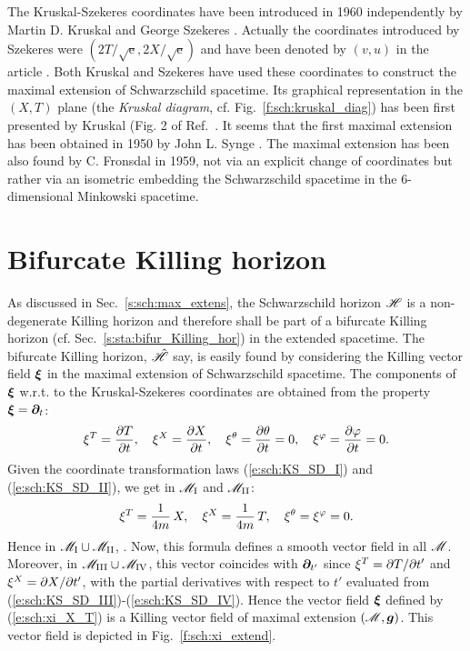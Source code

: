 \begin{hist}
\label{n:max:KS_coord}
The Kruskal-Szekeres coordinates have been introduced in 1960 independently
by Martin D. Kruskal \cite{Krusk60} and George Szekeres \cite{Szeke60}.
Actually the coordinates
introduced by Szekeres were $(2T/\sqrt{\mathrm{e}}, 2X/\sqrt{\mathrm{e}})$
and have been denoted by $(v,u)$ in the article \cite{Szeke60}. Both Kruskal and Szekeres
have used these coordinates to construct the maximal extension of Schwarzschild
spacetime. Its graphical representation in the $(X,T)$ plane (the
\emph{Kruskal diagram}, cf. Fig.~\ref{f:sch:kruskal_diag}) has been first presented by
Kruskal (Fig. 2 of Ref.~\cite{Krusk60}.
It seems that the first maximal extension has been obtained in 1950
by John L. Synge \cite{Synge50}.
The maximal extension has been also found by C. Fronsdal \cite{Frons59} in 1959, not via an explicit change of coordinates but rather via
an isometric embedding the Schwarzschild spacetime in the 6-dimensional Minkowski spacetime.
\end{hist}


\section{Bifurcate Killing horizon}

As discussed in Sec.~\ref{s:sch:max_extens}, the Schwarzschild horizon
$\mathscr{H}$ is
a non-degenerate Killing horizon and therefore shall be part of
a bifurcate Killing horizon (cf. Sec.~\ref{s:sta:bifur_Killing_hor})
in the extended spacetime.
The bifurcate Killing horizon, $\hat{\mathscr{H}}$ say, is easily found by
considering the Killing vector field $\bm{\xi}$ in the maximal extension
of Schwarzschild spacetime. The components of $\bm{\xi}$ w.r.t. to the
Kruskal-Szekeres coordinates are obtained from the
property $\bm{\xi} = \bm{\partial}_t$:
\[
    \xi^T = \frac{\partial T}{\partial t}, \quad
    \xi^X = \frac{\partial X}{\partial t}, \quad
    \xi^\theta = \frac{\partial \theta}{\partial t} = 0, \quad
    \xi^\varphi = \frac{\partial \varphi}{\partial t} = 0 .
\]
Given the coordinate transformation laws (\ref{e:sch:KS_SD_I})
and (\ref{e:sch:KS_SD_II}), we get in
$\mathscr{M}_{\rm I}$ and $\mathscr{M}_{\rm II}$:
\[
    \xi^T = \frac{1}{4m} \, X, \quad
    \xi^X = \frac{1}{4m} \, T , \quad
    \xi^\theta = \xi^\varphi = 0 .
\]
Hence in $\mathscr{M}_{\rm I}\cup\mathscr{M}_{\rm II}$,
\be \label{e:sch:xi_X_T}
    .
\ee
Now, this formula defines a smooth vector field in all $\mathscr{M}$.
Moreover, in $\mathscr{M}_{\rm III}\cup\mathscr{M}_{\rm IV}$, this vector coincides with
$\bm{\partial}_{t'}$ since $\xi^T = {\partial T}/{\partial t'}$ and $\xi^X = {\partial X}/{\partial t'}$,
with the partial derivatives with respect to $t'$ evaluated from
(\ref{e:sch:KS_SD_III})-(\ref{e:sch:KS_SD_IV}). Hence the vector field
$\bm{\xi}$ defined by (\ref{e:sch:xi_X_T}) is a Killing vector field
of maximal extension $(\mathscr{M},\bm{g})$. This vector field is depicted in
Fig.~\ref{f:sch:xi_extend}.

